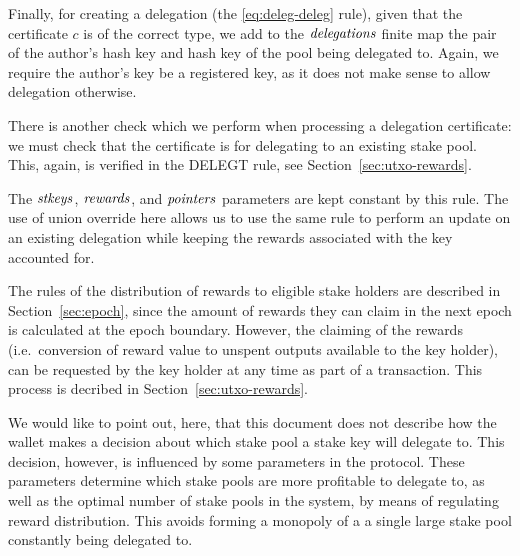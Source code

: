 Finally, for creating a delegation (the \cref{eq:deleg-deleg} rule),
given that the certificate $c$ is of the correct type, we add to the
$\mathit{delegations}$ finite map the pair of
the author's hash key and hash key of the pool being delegated to.
Again, we require the author's key be a registered key, as it does not make
sense to allow delegation otherwise.

There is another check which we perform when processing a delegation certificate:
we must check that the certificate is for delegating to an
existing stake pool. This, again, is verified in the DELEGT rule, see
Section~\ref{sec:utxo-rewards}.

The $\mathit{stkeys}$, $\mathit{rewards}$, and $\mathit{pointers}$ parameters are kept constant by
this rule. The use of union override here allows us to use the same rule
to perform an update on an existing delegation while keeping the rewards
associated with the key accounted for.

The rules of the distribution of rewards to eligible stake holders are described
in Section~\ref{sec:epoch}, since the amount of rewards they can claim in the next
epoch is calculated at the epoch boundary. However, the claiming of the rewards
(i.e.\ conversion of reward value to unspent outputs available to the key
holder), can be requested by the key holder at any time as part of a transaction.
This process is decribed in Section~\ref{sec:utxo-rewards}.

We would like to point out, here, that this document does not describe
how the wallet makes a decision about which stake pool a stake key will
delegate to. This decision, however, is influenced by some parameters in the
protocol. These parameters determine which stake pools are more profitable
to delegate to, as well as the optimal number of stake pools in the system,
by means of regulating reward distribution.
This avoids forming a monopoly of a a single large stake pool constantly
being delegated to.


